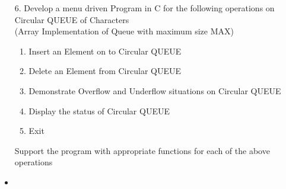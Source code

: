 \documentclass{article}
\newcommand{\answer}{\item [$\rightarrow$]}
\begin{document}
	\begin{itemize}
		\item [6.] Develop a menu driven Program in C for the following operations on Circular QUEUE of Characters \\
		(Array Implementation of Queue with maximum size MAX)
		\begin{enumerate}[label=\alph*.]
			\item Insert an Element on to Circular QUEUE
			\item Delete an Element from Circular QUEUE
			\item Demonstrate Overflow and Underflow situations on Circular QUEUE
			\item Display the status of Circular QUEUE
			\item Exit
		\end{enumerate}
		Support the program with appropriate functions for each of the above operations
		\answer \inputminted{c}{../../Program6.c}
	\end{itemize}
\end{document}
